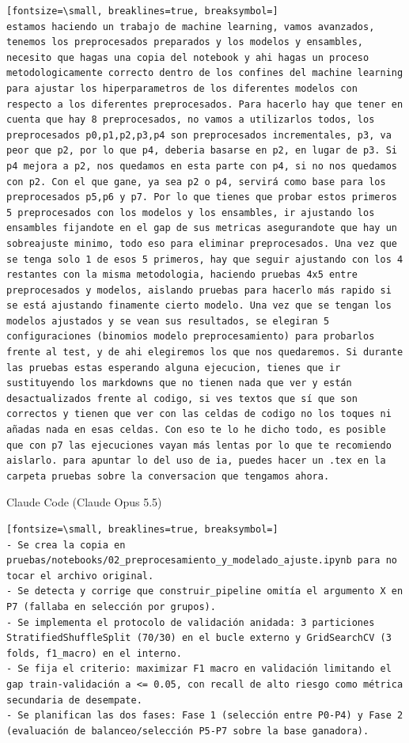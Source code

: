 \documentclass[12pt,a4paper,oneside]{book}
\begin{document}
\begin{iaprompt}
\begin{Verbatim}[fontsize=\small, breaklines=true, breaksymbol=]
estamos haciendo un trabajo de machine learning, vamos avanzados, tenemos los preprocesados preparados y los modelos y ensambles, necesito que hagas una copia del notebook y ahi hagas un proceso metodologicamente correcto dentro de los confines del machine learning para ajustar los hiperparametros de los diferentes modelos con respecto a los diferentes preprocesados. Para hacerlo hay que tener en cuenta que hay 8 preprocesados, no vamos a utilizarlos todos, los preprocesados p0,p1,p2,p3,p4 son preprocesados incrementales, p3, va peor que p2, por lo que p4, deberia basarse en p2, en lugar de p3. Si p4 mejora a p2, nos quedamos en esta parte con p4, si no nos quedamos con p2. Con el que gane, ya sea p2 o p4, servirá como base para los preprocesados p5,p6 y p7. Por lo que tienes que probar estos primeros 5 preprocesados con los modelos y los ensambles, ir ajustando los ensambles fijandote en el gap de sus metricas asegurandote que hay un sobreajuste minimo, todo eso para eliminar preprocesados. Una vez que se tenga solo 1 de esos 5 primeros, hay que seguir ajustando con los 4 restantes con la misma metodologia, haciendo pruebas 4x5 entre preprocesados y modelos, aislando pruebas para hacerlo más rapido si se está ajustando finamente cierto modelo. Una vez que se tengan los modelos ajustados y se vean sus resultados, se elegiran 5 configuraciones (binomios modelo preprocesamiento) para probarlos frente al test, y de ahi elegiremos los que nos quedaremos. Si durante las pruebas estas esperando alguna ejecucion, tienes que ir sustituyendo los markdowns que no tienen nada que ver y están desactualizados frente al codigo, si ves textos que sí que son correctos y tienen que ver con las celdas de codigo no los toques ni añadas nada en esas celdas. Con eso te lo he dicho todo, es posible que con p7 las ejecuciones vayan más lentas por lo que te recomiendo aislarlo. para apuntar lo del uso de ia, puedes hacer un .tex en la carpeta pruebas sobre la conversacion que tengamos ahora.
\end{Verbatim}
\end{iaprompt}
\begin{iaresp}{Claude Code (Claude Opus 5.5)}
\begin{Verbatim}[fontsize=\small, breaklines=true, breaksymbol=]
- Se crea la copia en pruebas/notebooks/02_preprocesamiento_y_modelado_ajuste.ipynb para no tocar el archivo original.
- Se detecta y corrige que construir_pipeline omitía el argumento X en P7 (fallaba en selección por grupos).
- Se implementa el protocolo de validación anidada: 3 particiones StratifiedShuffleSplit (70/30) en el bucle externo y GridSearchCV (3 folds, f1_macro) en el interno.
- Se fija el criterio: maximizar F1 macro en validación limitando el gap train-validación a <= 0.05, con recall de alto riesgo como métrica secundaria de desempate.
- Se planifican las dos fases: Fase 1 (selección entre P0-P4) y Fase 2 (evaluación de balanceo/selección P5-P7 sobre la base ganadora).
\end{Verbatim}
\end{iaresp}
\end{document}

